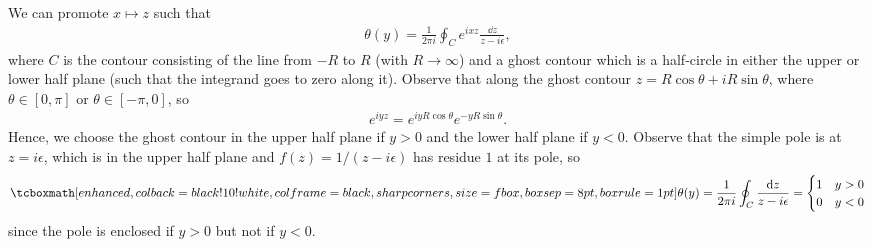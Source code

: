 We can promote $x \mapsto z$ such that 
\begin{eqnarray}
    \label{eq:contour-int-heaviside}
    \theta(y) = \frac{1}{2 \pi i} \oint_{C} e^{i x z} \frac{\dd{z}}{z - i\epsilon}
,\end{eqnarray}
where $C$ is the contour consisting of the line from $-R$ to $R$ (with $R \rightarrow \infty$) and a ghost contour which is a half-circle in either the upper or lower half plane (such that the integrand goes to zero along it).
Observe that along the ghost contour $z = R\cos{\theta} + i R\sin{\theta}$, where $\theta \in [0,\pi]$ or $\theta \in [-\pi,0]$, so
\begin{eqnarray}
    \label{eq:exponential}
    e^{i y z} = e^{i y R \cos{\theta}} e^{- y R \sin{\theta}}
.\end{eqnarray}
Hence, we choose the ghost contour in the upper half plane if $y > 0$ and the lower half plane if $y < 0$.
Observe that the simple pole is at $z = i \epsilon$, which is in the upper half plane and $f(z) = 1/(z - i\epsilon)$ has residue $1$ at its pole, so
\begin{eqnarray}
    \label{eq:result-6.34}
    \eqbox{
        \theta(y) = \frac{1}{2 \pi i} \oint_{C} \frac{\dd{z}}{z - i \epsilon} = \begin{cases}
            1 & y > 0 \\
            0 & y < 0
        \end{cases}
    } 
\end{eqnarray}
since the pole is enclosed if $y > 0$ but not if $y < 0$.





